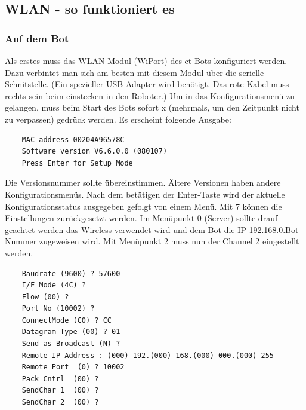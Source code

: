 \subsection{WLAN - so funktioniert es}
\label{wlan}

\subsubsection{Auf dem Bot}
\label{wlan_auf_bot}
Als erstes muss das WLAN-Modul (WiPort) des ct-Bots konfiguriert werden.
Dazu verbintet man sich am besten mit diesem Modul über die serielle Schnitstelle.
(Ein spezieller USB-Adapter wird benötigt. Das rote Kabel muss rechts sein beim 
einstecken in den Roboter.) Um in das Konfigurationsmenü zu gelangen,
muss beim Start des Bots sofort x (mehrmals, um den Zeitpunkt nicht zu verpassen)
gedrück werden. Es erscheint folgende Ausgabe:
\begin{verbatim}
    MAC address 00204A96578C
    Software version V6.6.0.0 (080107) 
    Press Enter for Setup Mode
\end{verbatim}
Die Versionsnummer sollte übereinstimmen. Ältere Versionen haben andere
Konfigurationsmenüs. Nach dem betätigen der Enter-Taste wird der aktuelle
Konfigurationsstatus ausgegeben gefolgt von einem Menü.
Mit 7 können die Einstellungen zurückgesetzt werden.
Im Menüpunkt 0 (Server) sollte drauf geachtet werden das Wireless verwendet wird
und dem Bot die IP 192.168.0.Bot-Nummer zugeweisen wird.
Mit Menüpunkt 2 muss nun der Channel 2 eingestellt werden.
\begin{verbatim}
    Baudrate (9600) ? 57600
    I/F Mode (4C) ? 
    Flow (00) ? 
    Port No (10002) ? 
    ConnectMode (C0) ? CC
    Datagram Type (00) ? 01
    Send as Broadcast (N) ? 
    Remote IP Address : (000) 192.(000) 168.(000) 000.(000) 255
    Remote Port  (0) ? 10002
    Pack Cntrl  (00) ? 
    SendChar 1  (00) ? 
    SendChar 2  (00) ? 
\end{verbatim}

